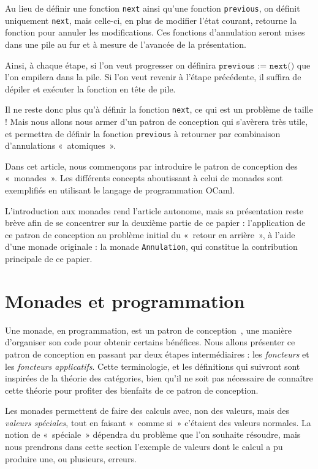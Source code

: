 \documentclass[final]{jflart}
\begin{document}
Au lieu de définir une fonction \texttt{next} ainsi qu'une fonction \texttt{previous}, on définit uniquement \texttt{next}, mais celle-ci, en plus de modifier l'état courant, retourne la fonction pour annuler les modifications. Ces fonctions d'annulation seront mises dans une pile au fur et à mesure de l'avancée de la présentation.

Ainsi, à chaque étape, si l'on veut progresser on définira $\texttt{previous := next()}$ que l'on empilera dans la pile. Si l'on veut revenir à l'étape précédente, il suffira de dépiler et exécuter la fonction en tête de pile.

Il ne reste donc plus qu'à définir la fonction \texttt{next}, ce qui est un problème de taille ! Mais nous allons nous armer d'un patron de conception qui s'avèrera très utile, et permettra de définir la fonction \texttt{previous} à retourner par combinaison d'annulations «~atomiques~».

Dans cet article, nous commençons par introduire le patron de conception des «~monades~». Les différents concepts aboutissant à celui de monades sont exemplifiés en utilisant le langage de programmation OCaml.

L'introduction aux monades rend l'article autonome, mais sa présentation reste brève afin de se concentrer sur la deuxième partie de ce papier : l'application de ce patron de conception au problème initial du «~retour en arrière~», à l'aide d'une monade originale : la monade \texttt{Annulation}, qui constitue la contribution principale de ce papier.

\section{Monades et programmation}

Une monade, en programmation, est un patron de conception~\cite{Wadler1993}, une manière
d'organiser son code pour obtenir certains bénéfices. Nous allons présenter ce
patron de conception en passant par deux étapes intermédiaires : les
\emph{foncteurs} et les \emph{foncteurs applicatifs}. Cette terminologie, et les
définitions qui suivront sont inspirées de la théorie des catégories, bien qu'il ne
soit pas nécessaire de connaître cette théorie pour profiter des bienfaits de ce
patron de conception.

Les monades permettent de faire des calculs avec, non des valeurs, mais des
\emph{valeurs spéciales}, tout en faisant «~comme si~» c'étaient des valeurs
normales. La notion de «~spéciale~» dépendra du problème que l'on souhaite
résoudre, mais nous prendrons dans cette section l'exemple de valeurs dont le
calcul a pu produire une, ou plusieurs, erreurs.
\end{document}
